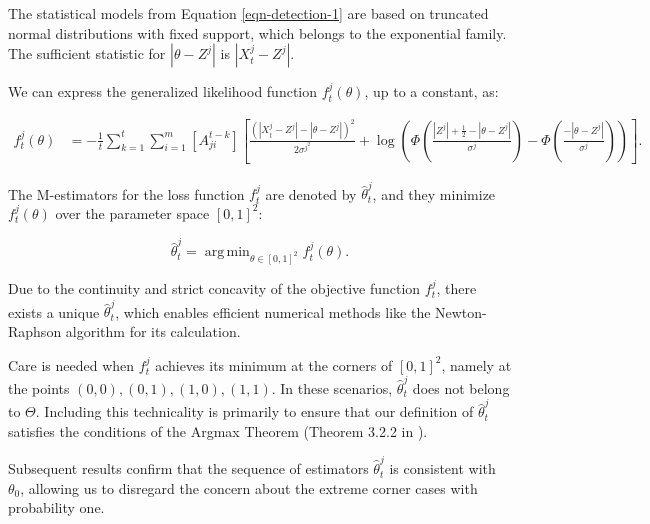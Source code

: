 \documentclass[twoside,11pt]{article}
\numberwithin{equation}{section}
\DeclareMathOperator*{\argmin}{arg\,min}
\begin{document}
{The statistical models from Equation \eqref{eqn-detection-1} are based on truncated normal distributions with fixed support, which belongs to the exponential family. The sufficient statistic for $|\theta - Z^j|$ is $|X_t^j - Z^j|$.

We can express the generalized likelihood function $f_t^j(\theta)$, up to a constant, as:

\begin{align*}
f_t^j(\theta) &= -\frac{1}{t} \sum_{k = 1}^t \sum_{i = 1}^m [A^{t-k}_{ji}] \left[\frac{(|X_t^j - Z^j| - |\theta - Z^j|)^2}{2 \sigma^{j^2}}  + \log \left(\Phi\left(\frac{|Z^j| + \frac{1}{2} - |\theta - Z^j|}{\sigma^j}\right) - \Phi\left(\frac{- |\theta - Z^j|}{\sigma^j}\right)\right) \right].
\end{align*}

The M-estimators for the loss function $f_t^j$ are denoted by $\hat{\theta}_t^j$, and they minimize $f_t^j(\theta)$ over the parameter space $[0,1]^2$:

\begin{equation}\label{eqn-detection-3}
    \hat{\theta}_t^j = \argmin_{\theta \in [0,1]^2} f_t^j(\theta).
\end{equation}

Due to the continuity and strict concavity of the objective function $f_t^j$, there exists a unique $\hat{\theta}_t^j$, which enables efficient numerical methods like the Newton-Raphson algorithm for its calculation.

Care is needed when $f_t^j$ achieves its minimum at the corners of $[0,1]^2$, namely at the points $(0,0), (0,1), (1,0), (1,1)$. In these scenarios, $\hat{\theta}_t^j$ does not belong to $\Theta$. Including this technicality is primarily to ensure that our definition of $\hat{\theta}_t^j$ satisfies the conditions of the Argmax Theorem (Theorem 3.2.2 in \cite{vaart2023empirical}).

Subsequent results confirm that the sequence of estimators $\hat{\theta}_t^j$ is consistent with $\theta_0$, allowing us to disregard the concern about the extreme corner cases with probability one.

}
\end{document}
